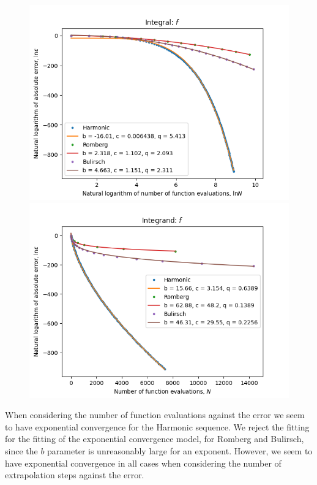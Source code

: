 \begin{figure}[H]
\centering
\begin{minipage}{0.45\textwidth}
\centering
\includegraphics[scale=0.45]{romberg_plots/cos_squared_hp_log_log_pow_fit_trend.png}
\end{minipage}
\begin{minipage}{0.45\textwidth}
\centering
\includegraphics[scale=0.45]{romberg_plots/cos_squared_hp_trend.png}
\end{minipage}
\end{figure}

When considering the number of function evaluations against the error we seem to have exponential convergence for the Harmonic sequence. We reject the fitting for the fitting of the exponential convergence model, for Romberg and Bulirsch, since the \(b\) parameter is unreasonably large for an exponent. However, we seem to have exponential convergence in all cases when considering the number of extrapolation steps against the error.\\


